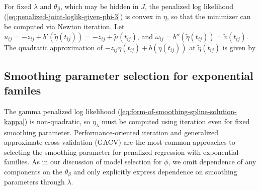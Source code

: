 \bigskip

For fixed $\lambda$ and $\theta_\beta$, which may be hidden in $J$, the penalized log likelihood (\ref{eq:penalized-joint-loglik-given-phi-3}) is convex in $\eta$, so that the minimizer can be computed via Newton iteration. Let $u_{ij} = -z_{ij} + b'\left( \tilde{\eta}\left(t_{ij}\right) \right) =  -z_{ij} +  \tilde{\mu}\left(t_{ij}\right)$, and $\tilde{\omega}_{ij} = b''\left( \tilde{\eta}\left(t_{ij}\right) \right) = \tilde{v}\left(t_{ij}\right)$. The quadratic approximation of $-z_{ij} \eta\left(t_{ij}\right) + b\left(\eta\left(t_{ij}\right)\right)$ at $\tilde{\eta}\left(t_{ij}\right)$ is given by 


\subsection{Smoothing parameter selection for exponential familes}

%

The gamma penalized log likelihood (\ref{eq:form-of-smoothing-spline-solution-kappa}) is non-quadratic, so $\eta_\lambda$ must be computed using iteration even for fixed smoothing parameter. Performance-oriented iteration and generalized approximate cross validation (GACV) are the most common approaches to selecting the smoothing parameter for penalized regression with exponential families. As in our discussion of model selection for $\phi$, we omit dependence of any components on the $\theta_\beta$ and only explicitly express dependence on smoothing parameters through $\lambda$.


